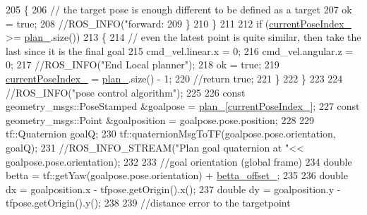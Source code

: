 \begin{DoxyCode}
205             \{
206                 \textcolor{comment}{// the target pose is enough different to be defined as a target}
207                 ok = \textcolor{keyword}{true};
208                 \textcolor{comment}{//ROS\_INFO("forward: %
209             \}
210         \}
211 
212         \textcolor{keywordflow}{if} (\hyperlink{classmove__base__z__client_1_1forward__local__planner_1_1ForwardLocalPlanner_a7033550f29cdac00cc997a3ce352dfd1}{currentPoseIndex\_} >= \hyperlink{classmove__base__z__client_1_1forward__local__planner_1_1ForwardLocalPlanner_a1c6191c999481e31fabd41f7a04041fe}{plan\_}.size())
213         \{
214             \textcolor{comment}{// even the latest point is quite similar, then take the last since it is the final goal}
215             cmd\_vel.linear.x = 0;
216             cmd\_vel.angular.z = 0;
217             \textcolor{comment}{//ROS\_INFO("End Local planner");}
218             ok = \textcolor{keyword}{true};
219             \hyperlink{classmove__base__z__client_1_1forward__local__planner_1_1ForwardLocalPlanner_a7033550f29cdac00cc997a3ce352dfd1}{currentPoseIndex\_} = \hyperlink{classmove__base__z__client_1_1forward__local__planner_1_1ForwardLocalPlanner_a1c6191c999481e31fabd41f7a04041fe}{plan\_}.size() - 1;
220             \textcolor{comment}{//return true;}
221         \}
222     \}
223 
224     \textcolor{comment}{//ROS\_INFO("pose control algorithm");}
225 
226     \textcolor{keyword}{const} geometry\_msgs::PoseStamped &goalpose = \hyperlink{classmove__base__z__client_1_1forward__local__planner_1_1ForwardLocalPlanner_a1c6191c999481e31fabd41f7a04041fe}{plan\_}[\hyperlink{classmove__base__z__client_1_1forward__local__planner_1_1ForwardLocalPlanner_a7033550f29cdac00cc997a3ce352dfd1}{currentPoseIndex\_}];
227     \textcolor{keyword}{const} geometry\_msgs::Point &goalposition = goalpose.pose.position;
228 
229     tf::Quaternion goalQ;
230     tf::quaternionMsgToTF(goalpose.pose.orientation, goalQ);
231     \textcolor{comment}{//ROS\_INFO\_STREAM("Plan goal quaternion at "<< goalpose.pose.orientation);}
232 
233     \textcolor{comment}{//goal orientation (global frame)}
234     \textcolor{keywordtype}{double} betta = tf::getYaw(goalpose.pose.orientation) + \hyperlink{classmove__base__z__client_1_1forward__local__planner_1_1ForwardLocalPlanner_a491ebf7d21303325b6751d8e9bf0aff9}{betta\_offset\_};
235 
236     \textcolor{keywordtype}{double} dx = goalposition.x - tfpose.getOrigin().x();
237     \textcolor{keywordtype}{double} dy = goalposition.y - tfpose.getOrigin().y();
238 
239     \textcolor{comment}{//distance error to the targetpoint}
}
\end{DoxyCode}
